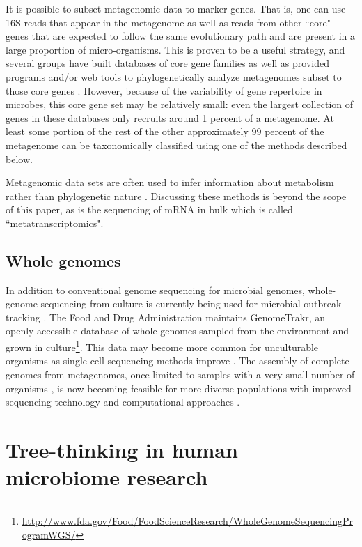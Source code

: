 \documentclass{amsart}
\begin{document}
It is possible to subset metagenomic data to marker genes.
That is, one can use 16S reads that appear in the metagenome as well as reads from other ``core" genes that are expected to follow the same evolutionary path and are present in a large proportion of micro-organisms.
This is proven to be a useful strategy, and several groups have built databases of core gene families as well as provided programs and/or web tools to phylogenetically analyze metagenomes subset to those core genes \citep{von2007quantitative,wu2008amphora,stark2010mltreemap,kembel2011phylogenetic,Darling2014-ux}.
However, because of the variability of gene repertoire in microbes, this core gene set may be relatively small: even the largest collection of genes in these databases only recruits around 1 percent of a metagenome.
At least some portion of the rest of the other approximately 99 percent of the metagenome can be taxonomically classified using one of the methods described below.

Metagenomic data sets are often used to infer information about metabolism rather than phylogenetic nature \citep{abubucker2012metabolic,greenblum2012metagenomic}.
Discussing these methods is beyond the scope of this paper, as is the sequencing of mRNA in bulk which is called ``metatranscriptomics".

\subsection{Whole genomes}
In addition to conventional genome sequencing for microbial genomes, whole-genome sequencing from culture is currently being used for microbial outbreak tracking \citep{koser2012rapid,snitkin2012tracking}.
The Food and Drug Administration maintains GenomeTrakr, an openly accessible database of whole genomes sampled from the environment and grown in culture\footnote{\url{http://www.fda.gov/Food/FoodScienceResearch/WholeGenomeSequencingProgramWGS/}}.
This data may become more common for unculturable organisms as single-cell sequencing methods improve \citep[reviewed in][]{kalisky2011single}.
The assembly of complete genomes from metagenomes, once limited to samples with a very small number of organisms \citep{baker2010enigmatic}, is now becoming feasible for more diverse populations with improved sequencing technology and computational approaches \citep{emerson2012metagenomic,howe2012assembling,iverson2012untangling,pell2012scaling,podell2013assembly}.


\section{Tree-thinking in human microbiome research}
\end{document}
